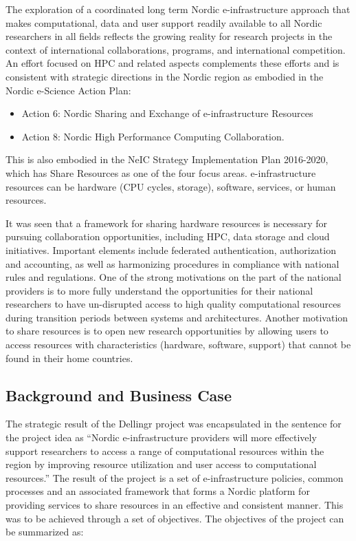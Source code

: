 \documentclass{article}
\newcommand{\dell}{Dellingr\xspace}
\newcommand{\einfra}{e-infrastructure\xspace}
\begin{document}
The exploration of a coordinated long term Nordic \einfra approach that makes computational, data and user support readily available to all Nordic researchers in all fields reflects the growing reality for research projects in the context of international collaborations, programs, and international competition.
An effort focused on HPC and related aspects complements these efforts and is consistent with strategic directions in the Nordic region as embodied in the Nordic e-Science Action Plan:
\begin{itemize}
\item Action 6: Nordic Sharing and Exchange of \einfra Resources
\item Action 8: Nordic High Performance Computing Collaboration.
\end{itemize}

This is also embodied in the NeIC Strategy Implementation Plan 2016-2020, which has Share Resources as one of the four focus areas.
\einfra resources can be hardware (CPU cycles, storage), software, services, or human resources. 

It was seen that a framework for sharing hardware resources is necessary for pursuing collaboration opportunities, including HPC, data storage and cloud initiatives. 
Important elements include federated authentication, authorization and accounting, as well as harmonizing procedures in compliance with national rules and regulations. 
One of the strong motivations on the part of the national providers is to more fully understand the opportunities for their national researchers to have un-disrupted access to high quality computational resources during transition periods between systems and architectures. 
Another motivation to share resources is to open new research opportunities by allowing users to access resources with characteristics (hardware, software, support) that cannot be found in their home countries.


\subsection{Background and Business Case}
\label{ssec:background}

The strategic result of the \dell project was encapsulated 
in the sentence for the project idea as ``Nordic \einfra providers will more effectively support researchers to access a range of computational
resources within the region by improving resource utilization and user access to computational resources.''
The result of the project is a set of \einfra policies, common processes and an associated framework that forms a Nordic platform for providing services to share resources in an effective and consistent manner.
This was to be achieved through a set of objectives.
The objectives of the project can be summarized as: \\
\end{document}

